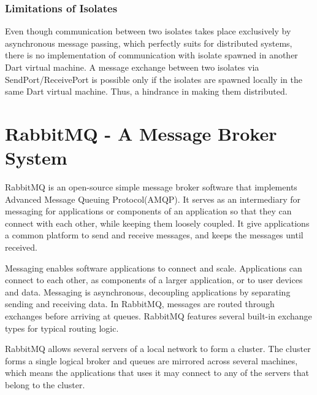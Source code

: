   \subsubsection{Limitations of Isolates}
  Even though communication between two isolates takes place exclusively by asynchronous message passing, which perfectly suits for distributed systems, there is no implementation of communication with isolate spawned in another Dart virtual machine. A message exchange between two isolates via SendPort/ReceivePort is possible only if the isolates are spawned locally in the same Dart virtual machine. Thus, a hindrance in making them distributed.

\section{RabbitMQ - A Message Broker System}
\label{sec:rabbitmq}
  RabbitMQ is an open-source simple message broker software that implements Advanced Message Queuing Protocol(AMQP). It serves as an intermediary for messaging for applications or components of an application so that they can connect with each other, while keeping them loosely coupled. It give applications a common platform to send and receive messages, and keeps the messages until received.~\cite{rabbitmqFeatures}

  Messaging enables software applications to connect and scale. Applications can connect to each other, as components of a larger application, or to user devices and data. Messaging is asynchronous, decoupling applications by separating sending and receiving data. In RabbitMQ, messages are routed through exchanges before arriving at queues. RabbitMQ features several built-in exchange types for typical routing logic.~\cite{rabbitmqFeatures}

  RabbitMQ allows several servers of a local network to form a cluster. The cluster forms a single logical broker and queues are mirrored across several machines, which means the applications that uses it may connect to any of the servers that belong to the cluster.~\cite{rabbitmqFeatures}

